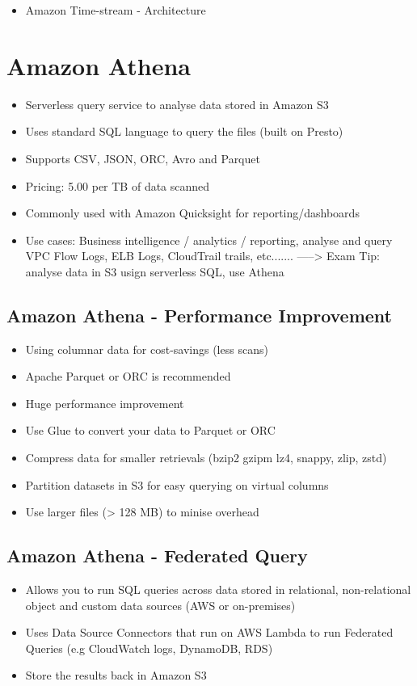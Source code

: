 \begin{itemize}
    \item Amazon Time-stream - Architecture
\end{itemize}


\section{Amazon Athena}
\begin{itemize}
    \item Serverless query service to analyse data stored in Amazon S3
    \item Uses standard SQL language to query the files (built on Presto)
    \item Supports CSV, JSON, ORC, Avro and Parquet
    \item Pricing: 5.00 per TB of data scanned
    \item Commonly used with Amazon Quicksight for reporting/dashboards
    \item Use cases: Business intelligence / analytics / reporting, analyse and query VPC Flow Logs, ELB Logs, CloudTrail trails, etc.......
    -----> Exam Tip: analyse data in S3 usign serverless SQL, use Athena
\end{itemize}

\subsection{Amazon Athena - Performance Improvement}
\begin{itemize}
    \item Using columnar data for cost-savings (less scans)
    \item Apache Parquet or ORC is recommended
    \item Huge performance improvement
    \item Use Glue to convert your data to Parquet or ORC
    \item Compress data for smaller retrievals (bzip2 gzipm lz4, snappy, zlip, zstd)
    \item Partition datasets in S3 for easy querying on virtual columns
    \item Use larger files (> 128 MB) to minise overhead
\end{itemize}

\subsection{Amazon Athena - Federated Query}
\begin{itemize}
    \item Allows you to run SQL queries across data stored in relational, non-relational object and custom data sources (AWS or on-premises)
    \item Uses Data Source Connectors that run on AWS Lambda to run Federated Queries (e.g CloudWatch logs, DynamoDB, RDS)
    \item Store the results back in Amazon S3
\end{itemize}

